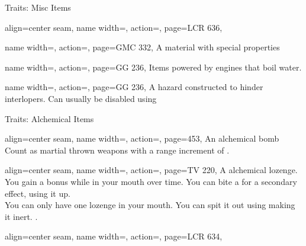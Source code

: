 \begin{PageFrontLandscape}
\begin{TablesHalf}{\frontTableHeight}
\begin{Table}{Traits: Misc Items}
\begin{entry}{}{%
                align=center seam,
                name width=\conditionLength,%
                action=\Snare,
                page=LCR 636,
            }
            \end{entry}
            \begin{entry}{}{%
                name width=\conditionLength,%
                action=\Precious,
                page=GMC 332,
            }
                A material with special properties
            \end{entry}
            \begin{entry}{}{%
                name width=\conditionLength,%
                action=\Steam,
                page=GG 236,
            }
                Items powered by engines that boil water.
            \end{entry}
            \begin{entry}{}{%
                name width=\conditionLength,%
                action=\Trap,
                page=GG 236,
            }
                A hazard constructed to hinder interlopers.\hfill
                Can usually be disabled using 
            \end{entry}
        \end{Table}\TableSpace
        \begin{Table}{Traits: Alchemical Items}
            \begin{entry}{}{%
                align=center seam,
                name width=\conditionLength,%
                action=\Bomb,
                page=453,
            }
                An alchemical bomb \hfill {} \\
                Count as martial thrown weapons with a range increment of  \Feet.\hfill
            \end{entry}
            \begin{entry}{}{%
                align=center seam,
                name width=\conditionLength,%
                action=\Lozenge,
                page=TV 220,
            }
                A alchemical lozenge. You gain a bonus while in your mouth over time. \hfill
                You can bite a for a secondary effect, using it up.\\
                You can only have one lozenge in your mouth.
                You can spit it out using  making it inert.\hfill
                .
            \end{entry}
            \begin{entry}{}{%
                align=center seam,
                name width=\conditionLength,%
                action=\Mutagen,
                page=LCR 634,
            }

\end{entry}
\end{Table}
\end{TablesHalf}
\end{PageFrontLandscape}
